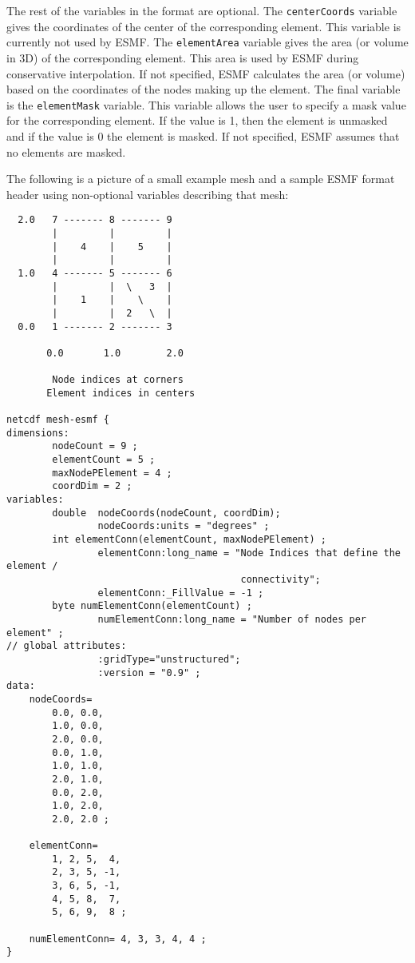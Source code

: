  The rest of the variables in the format are optional. The {\tt centerCoords} variable gives the coordinates of the center of the corresponding element.
 This variable is currently not used by ESMF. The {\tt elementArea} variable gives the area (or volume in 3D) of the corresponding element. This
 area is used by ESMF during conservative interpolation. If not specified, ESMF calculates the area (or volume) based on the coordinates of the nodes
 making up the element. The final variable is the {\tt elementMask} variable. This variable allows the user to specify a mask value for
 the corresponding element. If the value is 1, then the element is unmasked and if the value is 0 the element is masked.
 If not specified, ESMF assumes that no elements are masked.

The following is a picture of a small example mesh and a sample ESMF format header using non-optional variables describing that mesh:

\begin{verbatim}
  2.0   7 ------- 8 ------- 9
        |         |         |
        |    4    |    5    |
        |         |         |
  1.0   4 ------- 5 ------- 6
        |         |  \   3  |
        |    1    |    \    |
        |         |  2   \  |
  0.0   1 ------- 2 ------- 3

       0.0       1.0        2.0

        Node indices at corners
       Element indices in centers

netcdf mesh-esmf {
dimensions:
        nodeCount = 9 ;
        elementCount = 5 ;
        maxNodePElement = 4 ;
        coordDim = 2 ;
variables:
        double  nodeCoords(nodeCount, coordDim);
                nodeCoords:units = "degrees" ;
        int elementConn(elementCount, maxNodePElement) ;
                elementConn:long_name = "Node Indices that define the element /
                                         connectivity";
                elementConn:_FillValue = -1 ;
        byte numElementConn(elementCount) ;
                numElementConn:long_name = "Number of nodes per element" ;
// global attributes:
                :gridType="unstructured";
                :version = "0.9" ;
data:
    nodeCoords=
        0.0, 0.0,
        1.0, 0.0,
        2.0, 0.0,
        0.0, 1.0,
        1.0, 1.0,
        2.0, 1.0,
        0.0, 2.0,
        1.0, 2.0,
        2.0, 2.0 ;

    elementConn=
        1, 2, 5,  4,
        2, 3, 5, -1,
        3, 6, 5, -1,
        4, 5, 8,  7,
        5, 6, 9,  8 ;

    numElementConn= 4, 3, 3, 4, 4 ;
}

\end{verbatim}

